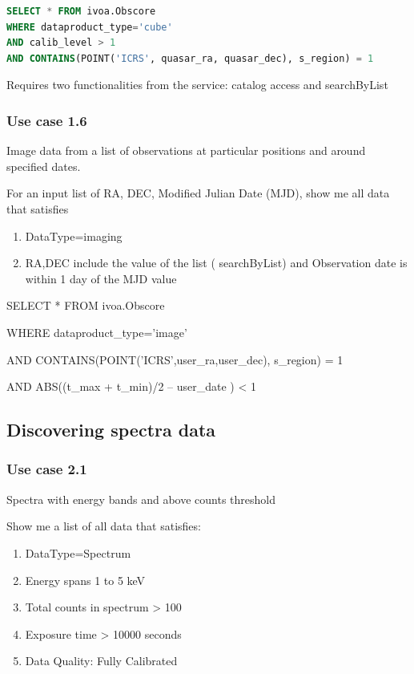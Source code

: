 \documentclass[11pt,a4paper]{ivoa}
\begin{document}
\begin{lstlisting}[language=SQL,flexiblecolumns=true]
SELECT * FROM ivoa.Obscore
WHERE dataproduct_type='cube'
AND calib_level > 1
AND CONTAINS(POINT('ICRS', quasar_ra, quasar_dec), s_region) = 1
\end{lstlisting}

Requires two functionalities from the service: catalog access and searchByList 

\subsubsection[Use case 1.6 ]{Use case 1.6}
Image data from a list of observations at particular positions and around specified dates.

For an input list of RA, DEC, Modified Julian Date (MJD), show me all data that satisfies 

\begin{enumerate}
\item DataType=imaging
\item RA,DEC include the value of  the list ( searchByList) and Observation date is within 1 day of the MJD value
\end{enumerate}
SELECT * FROM ivoa.Obscore

WHERE dataproduct\_type='image'

AND CONTAINS(POINT('ICRS',user\_ra,user\_dec), s\_region) = 1

AND ABS((t\_max + t\_min)/2 -- user\_date ) {\textless} 1 

\subsection{Discovering spectra data}
\subsubsection{Use case 2.1}
Spectra with energy bands and above counts threshold

Show me a list of all data that satisfies:

\begin{enumerate}
\item DataType=Spectrum
\item Energy spans 1 to 5 keV
\item Total counts in spectrum {\textgreater} 100
\item Exposure time {\textgreater} 10000 seconds
\item Data Quality: Fully Calibrated
\end{enumerate}
\end{document}
